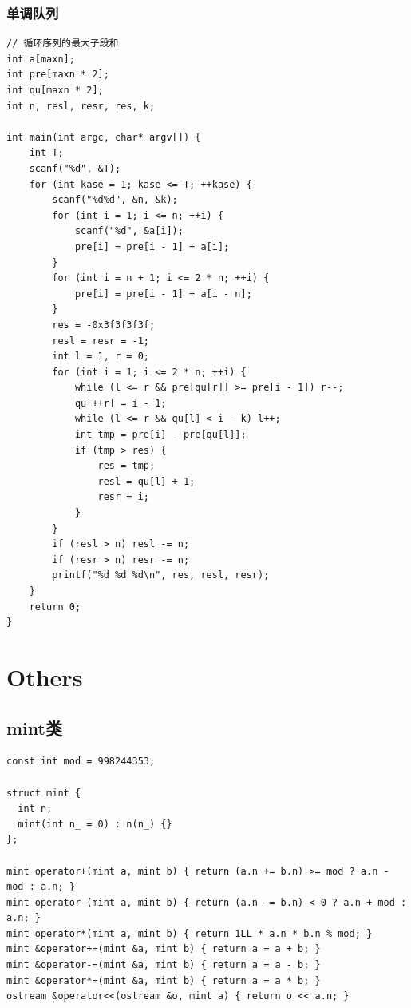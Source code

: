 \documentclass[twoside]{article}
\begin{document}
\subsubsection{单调队列}
\begin{lstlisting}
// 循环序列的最大子段和
int a[maxn];
int pre[maxn * 2];
int qu[maxn * 2];
int n, resl, resr, res, k;

int main(int argc, char* argv[]) {
    int T;
    scanf("%d", &T);
    for (int kase = 1; kase <= T; ++kase) {
        scanf("%d%d", &n, &k);
        for (int i = 1; i <= n; ++i) {
            scanf("%d", &a[i]);
            pre[i] = pre[i - 1] + a[i];
        }
        for (int i = n + 1; i <= 2 * n; ++i) {
            pre[i] = pre[i - 1] + a[i - n];
        }
        res = -0x3f3f3f3f;
        resl = resr = -1;
        int l = 1, r = 0;
        for (int i = 1; i <= 2 * n; ++i) {
            while (l <= r && pre[qu[r]] >= pre[i - 1]) r--;
            qu[++r] = i - 1;
            while (l <= r && qu[l] < i - k) l++;
            int tmp = pre[i] - pre[qu[l]];
            if (tmp > res) {
                res = tmp;
                resl = qu[l] + 1;
                resr = i;
            }
        }
        if (resl > n) resl -= n;
        if (resr > n) resr -= n;
        printf("%d %d %d\n", res, resl, resr);
    }
    return 0;
}\end{lstlisting}
\clearpage\section{Others}
\subsection{mint类}
\begin{lstlisting}
const int mod = 998244353;

struct mint {
  int n;
  mint(int n_ = 0) : n(n_) {}
};

mint operator+(mint a, mint b) { return (a.n += b.n) >= mod ? a.n - mod : a.n; }
mint operator-(mint a, mint b) { return (a.n -= b.n) < 0 ? a.n + mod : a.n; }
mint operator*(mint a, mint b) { return 1LL * a.n * b.n % mod; }
mint &operator+=(mint &a, mint b) { return a = a + b; }
mint &operator-=(mint &a, mint b) { return a = a - b; }
mint &operator*=(mint &a, mint b) { return a = a * b; }
ostream &operator<<(ostream &o, mint a) { return o << a.n; }
\end{lstlisting}
\end{document}
